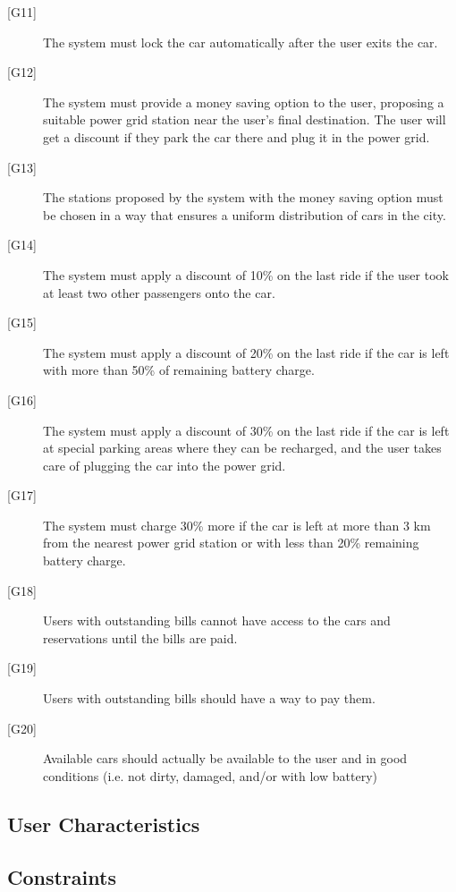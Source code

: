 \documentclass[english]{article}
\begin{document}
\begin{description}
	\item[{[G11]}]{The system must lock the car automatically after the user exits the car.}
	\item[{[G12]}]{The system must provide a money saving option to the user, proposing a suitable power grid station near the user’s final destination. The user will get a discount if they park the car there and plug it in the power grid.}
	\item[{[G13]}]{The stations proposed by the system with the money saving option must be chosen in a way that ensures a uniform distribution of cars in the city.}
	\item[{[G14]}]{The system must apply a discount of 10\% on the last ride if the user took at least two other passengers onto the car.}
	\item[{[G15]}]{The system must apply a discount of 20\% on the last ride if the car is left with more than 50\% of remaining battery charge.}
	\item[{[G16]}]{The system must apply a discount of 30\% on the last ride if the car is left at special parking areas where they can be recharged, and the user takes care of plugging the car into the power grid.}
	\item[{[G17]}]{The system must charge 30\% more if the car is left at more than 3 km from the nearest power grid station or with less than 20\% remaining battery charge.}
	\item[{[G18]}]{Users with outstanding bills cannot have access to the cars and reservations until the bills are paid.}
	\item[{[G19]}]{Users with outstanding bills should have a way to pay them.}
	\item[{[G20]}]{Available cars should actually be available to the user and in good conditions (i.e. not dirty, damaged, and/or with low battery)}
\end{description}

\subsection{User Characteristics}

\subsection{Constraints}\label{constraints}
\end{document}
